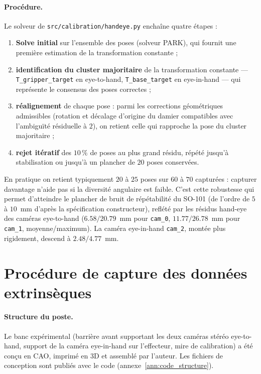 \paragraph{Procédure.}
Le solveur de \texttt{src/calibration/handeye.py} enchaîne quatre étapes :
\begin{enumerate}
  \item \textbf{Solve initial} sur l'ensemble des poses (solveur PARK), qui
        fournit une première estimation de la transformation constante ;
  \item \textbf{identification du cluster majoritaire} de la transformation
        constante --- \texttt{T\_gripper\_target} en eye-to-hand,
        \texttt{T\_base\_target} en eye-in-hand --- qui représente le consensus
        des poses correctes ;
  \item \textbf{réalignement} de chaque pose : parmi les corrections
        géométriques admissibles (rotation et décalage d'origine du damier
        compatibles avec l'ambiguïté résiduelle à $2$), on retient celle qui
        rapproche la pose du cluster majoritaire ;
  \item \textbf{rejet itératif} des $10\,\%$ de poses au plus grand résidu,
        répété jusqu'à stabilisation ou jusqu'à un plancher de $20$ poses
        conservées.
\end{enumerate}
En pratique on retient typiquement $20$ à $25$ poses sur $60$ à $70$
capturées : capturer davantage n'aide pas si la diversité angulaire est
faible. C'est cette robustesse qui permet d'atteindre le plancher de bruit de
répétabilité du SO-101 (de l'ordre de $5$ à $10$~mm d'après la spécification
constructeur), reflété par les résidus hand-eye des caméras eye-to-hand
($6.58 / 20.79$~mm pour \texttt{cam\_0}, $11.77 / 26.78$~mm pour
\texttt{cam\_1}, moyenne/maximum). La caméra eye-in-hand \texttt{cam\_2},
montée plus rigidement, descend à $2.48 / 4.77$~mm.

\section{Procédure de capture des données extrinsèques}
\label{ann:capture_extr}

\paragraph{Structure du poste.}
Le banc expérimental (barrière avant supportant les deux caméras stéréo
eye-to-hand, support de la caméra eye-in-hand sur l'effecteur, mire de
calibration) a été conçu en CAO, imprimé en 3D et assemblé par l'auteur. Les
fichiers de conception sont publiés avec le code
(annexe~\ref{ann:code_structure}). 

